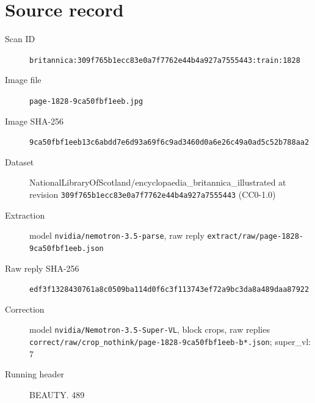 \documentclass{article}
\begin{document}
\section*{Source record}
\begin{description}
\item[Scan ID] \texttt{britannica:309f765b1ecc83e0a7f7762e44b4a927a7555443:train:1828}
\item[Image file] \texttt{page-1828-9ca50fbf1eeb.jpg}
\item[Image SHA-256] \texttt{9ca50fbf1eeb13c6abdd7e6d93a69f6c9ad3460d0a6e26c49a0ad5c52b788aa2}
\item[Dataset] NationalLibraryOfScotland/encyclopaedia\_britannica\_illustrated at revision \texttt{309f765b1ecc83e0a7f7762e44b4a927a7555443} (CC0-1.0)
\item[Extraction] model \texttt{nvidia/nemotron-3.5-parse}, raw reply \texttt{extract/raw/page-1828-9ca50fbf1eeb.json}
\item[Raw reply SHA-256] \texttt{edf3f1328430761a8c0509ba114d0f6c3f113743ef72a9bc3da8a489daa87922}
\item[Correction] model \texttt{nvidia/Nemotron-3.5-Super-VL}, block crops, raw replies \texttt{correct/raw/crop\_nothink/page-1828-9ca50fbf1eeb-b*.json}; super\_vl: 7
\item[Running header] BEAUTY. 489
\end{description}
\end{document}
